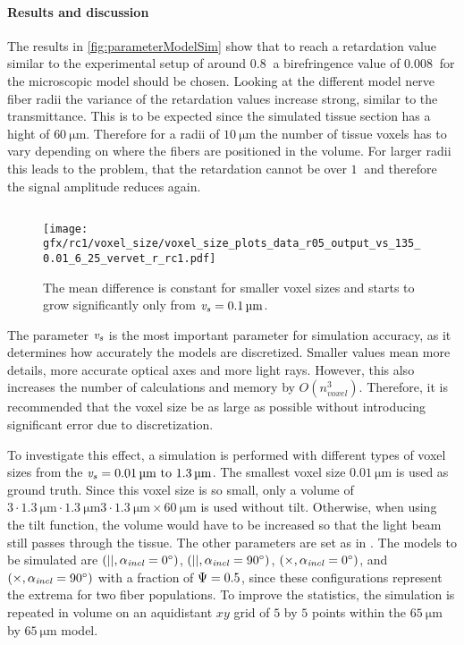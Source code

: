 \paragraph{Results and discussion}
The results in \cref{fig:parameterModelSim} show that to reach a retardation value similar to the experimental setup of around $\SI{0.8}{}$ a birefringence value of $\SI{0.008}{}$ for the microscopic model should be chosen.
Looking at the different model nerve fiber radii the variance of the retardation values increase strong, similar to the transmittance.
This is to be expected since the simulated tissue section has a hight of $\SI{60}{\micro\meter}$.
Therefore for a radii of $\SI{10}{\micro\meter}$ the number of tissue voxels has to vary depending on where the fibers are positioned in the volume.
For larger radii this leads to the problem, that the retardation cannot be over $\SI{1}{}$ and therefore the signal amplitude reduces again.
%
%
%
\subsection{\Voxelsize{} \texorpdfstring{\voxelsize{}}{}}
%
\begin{figure}[!t]%
\centering
\texttt{[image: gfx/rc1/voxel\_size/voxel\_size\_plots\_data\_r05\_output\_vs\_135\_0.01\_6\_25\_vervet\_r\_rc1.pdf]}
\caption{The mean difference is constant for smaller voxel sizes and starts to grow significantly only from $\voxelsize=\SI{0.1}{\micro\meter}$.}
\label{fig:voxelsizeNoise}
\end{figure}
%
The parameter \Voxelsize{} $\textnormal{$\mathit{v_{s}}$}$ is the most important parameter for simulation accuracy, as it determines how accurately the models are discretized.
Smaller values mean more details, more accurate optical axes and more light rays.
However, this also increases the number of calculations and memory by $O(n_{\mathit{voxel}}^3)$.
Therefore, it is recommended that the voxel size be as large as possible without introducing significant error due to discretization.
\par
%
To investigate this effect, a simulation is performed with different types of voxel sizes from the $\voxelsize = \SIrange{0.01}{1.3}{\micro\meter}$.
The smallest voxel size $\SI{0.01}{\micro\meter}$ is used as ground truth.
Since this voxel size is so small, only a volume of $3 \cdot \SI{1.3}{\micro\meter} \cdot \SI{1.3}{\micro\meter} 3 \cdot \SI{1.3}{\micro\meter} \times \SI{60}{\micro\meter}$ is used without tilt.
Otherwise, when using the tilt function, the volume would have to be increased so that the light beam still passes through the tissue.
The other parameters are set as in \dummy{}.
The models to be simulated are $(||,\textnormal{$\alpha_{\mathit{incl}}$} = \SI{0}{\degree})$, $(||,\textnormal{$\alpha_{\mathit{incl}}$} = \SI{90}{\degree})$, $(\times, \textnormal{$\alpha_{\mathit{incl}}$} = \SI{0}{\degree})$, and $(\times,\textnormal{$\alpha_{\mathit{incl}}$} = \SI{90}{\degree})$ with a fraction of $\textnormal{$\Psi$} = \SI{0.5}{}$, since these configurations represent the extrema for two fiber populations.
To improve the statistics, the simulation is repeated in volume on an aquidistant $xy$ grid of $\num{5}$ by $\num{5}$ points within the $\SI{65}{\micro\meter}$ by $\SI{65}{\micro\meter}$ model.
%
